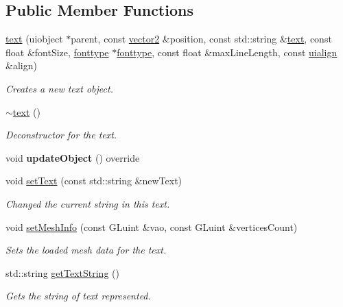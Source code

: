 \subsection*{Public Member Functions}
\begin{DoxyCompactItemize}
\item 
\hyperlink{classflounder_1_1text_a4b99960617867cc5159778aa42d99a19}{text} (uiobject $\ast$parent, const \hyperlink{classflounder_1_1vector2}{vector2} \&position, const std\+::string \&\hyperlink{classflounder_1_1text}{text}, const float \&font\+Size, \hyperlink{classflounder_1_1fonttype}{fonttype} $\ast$\hyperlink{classflounder_1_1fonttype}{fonttype}, const float \&max\+Line\+Length, const \hyperlink{namespaceflounder_a70f1871d5c05aa8e078dd37501ce10a9}{uialign} \&align)
\begin{DoxyCompactList}\small\item\em Creates a new text object. \end{DoxyCompactList}\item 
\hyperlink{classflounder_1_1text_af83a9cff2e1e78a7ec0203034375059b}{$\sim$text} ()
\begin{DoxyCompactList}\small\item\em Deconstructor for the text. \end{DoxyCompactList}\item 
\mbox{\label{classflounder_1_1text_a7f17850ab35de4e4797f699c1858e142}} 
void {\bfseries update\+Object} () override
\item 
void \hyperlink{classflounder_1_1text_a4afc45fc499ba1aef7977aee18e9ef66}{set\+Text} (const std\+::string \&new\+Text)
\begin{DoxyCompactList}\small\item\em Changed the current string in this text. \end{DoxyCompactList}\item 
void \hyperlink{classflounder_1_1text_ac054e01c7cbe05522d3e778f23e951bd}{set\+Mesh\+Info} (const G\+Luint \&vao, const G\+Luint \&vertices\+Count)
\begin{DoxyCompactList}\small\item\em Sets the loaded mesh data for the text. \end{DoxyCompactList}\item 
std\+::string \hyperlink{classflounder_1_1text_a6eb2c9461c6fb9fd78bd97d56846f562}{get\+Text\+String} ()
\begin{DoxyCompactList}\small\item\em Gets the string of text represented. \end{DoxyCompactList}\item 

\end{DoxyCompactItemize}
